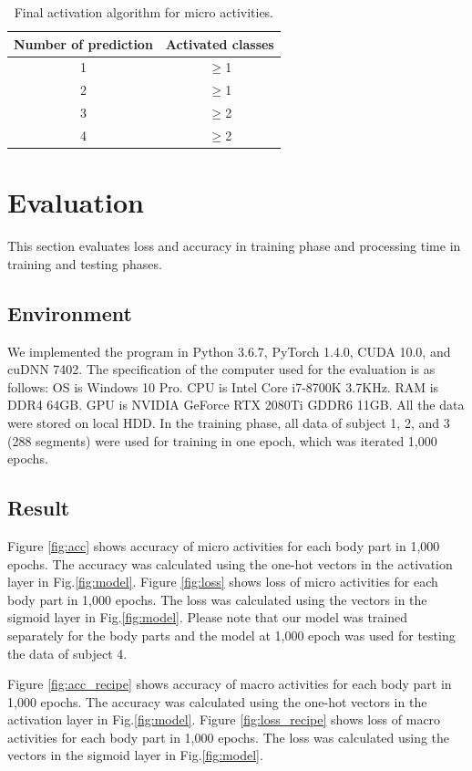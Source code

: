 \documentclass{svmult}
\begin{document}
\begin{table}[h]
    \centering
    \begin{tabular}{c|c}\hline\hline
        Number of prediction & Activated classes \\\hline
        1 & $\geq$1\\
        2 & $\geq$1\\
        3 & $\geq$2\\
        4 & $\geq$2\\\hline
    \end{tabular}
    \caption{Final activation algorithm for micro activities.}
    \label{tab:activation}
\end{table}

\section{Evaluation}
\label{sec:evaluation}
This section evaluates loss and accuracy in training phase and processing time in training and testing phases.

\subsection{Environment}
We implemented the program in Python 3.6.7, PyTorch 1.4.0, CUDA 10.0, and cuDNN 7402. The specification of the computer used for the evaluation is as follows: OS is Windows 10 Pro. CPU is Intel Core i7-8700K 3.7KHz. RAM is DDR4 64GB. GPU is NVIDIA GeForce RTX 2080Ti GDDR6 11GB. All the data were stored on local HDD.
In the training phase, all data of subject 1, 2, and 3 (288 segments) were used for training in one epoch, which was iterated 1,000 epochs.

\subsection{Result}
Figure \ref{fig:acc} shows accuracy of micro activities for each body part in 1,000 epochs. The accuracy was calculated using the one-hot vectors in the activation layer in Fig.\ref{fig:model}. Figure \ref{fig:loss} shows loss of micro activities for each body part in 1,000 epochs. The loss was calculated using the vectors in the sigmoid layer in Fig.\ref{fig:model}. Please note that our model was trained separately for the body parts and the model at 1,000 epoch was used for testing the data of subject 4.

Figure \ref{fig:acc_recipe} shows accuracy of macro activities for each body part in 1,000 epochs. The accuracy was calculated using the one-hot vectors in the activation layer in Fig.\ref{fig:model}. Figure \ref{fig:loss_recipe} shows loss of macro activities for each body part in 1,000 epochs. The loss was calculated using the vectors in the sigmoid layer in Fig.\ref{fig:model}. 
\end{document}
